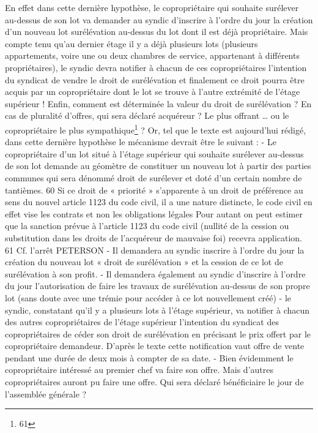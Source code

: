 	En effet dans cette dernière hypothèse, le copropriétaire qui souhaite surélever au-dessus de son lot va demander au syndic d’inscrire à l’ordre du jour la création d’un nouveau lot surélévation au-dessus du lot dont il est déjà propriétaire.
	Mais compte tenu qu’au dernier étage il y a déjà plusieurs lots (plusieurs appartements, voire une ou deux chambres de service, appartenant à différents propriétaires), le syndic devra notifier à chacun de ces copropriétaires l’intention du syndicat de vendre le droit de surélévation et finalement ce droit pourra être acquis par un copropriétaire dont le lot se trouve à l’autre extrémité de l’étage supérieur !
	Enfin, comment est déterminée la valeur du droit de surélévation ? En cas de pluralité d’offres, qui sera déclaré acquéreur ? Le plus offrant … ou le copropriétaire le plus sympathique\footnote{61} ?
	Or, tel que le texte est aujourd’hui rédigé, dans cette dernière hypothèse le mécanisme devrait être le suivant :
	- Le copropriétaire d’un lot situé à l’étage supérieur qui souhaite surélever au-dessus de son lot demande au géomètre de constituer un nouveau lot à partir des parties communes qui sera dénommé droit de surélever et doté d’un certain nombre de tantièmes.
	60 Si ce droit de « priorité » s’apparente à un droit de préférence au sens du nouvel article 1123 du code civil, il a une nature distincte, le code civil en effet vise les contrats et non les obligations légales Pour autant on peut estimer que la sanction prévue à l’article 1123 du code civil (nullité de la cession ou substitution dans les droits de l’acquéreur de mauvaise foi) recevra application.
	61 Cf. l’arrêt PETERSON
	- Il demandera au syndic inscrire à l’ordre du jour la création du nouveau lot « droit de surélévation » et la cession de ce lot de surélévation à son profit.
	- Il demandera également au syndic d’inscrire à l’ordre du jour l’autorisation de faire les travaux de surélévation au-dessus de son propre lot (sans doute avec une trémie pour accéder à ce lot nouvellement créé)
	- le syndic, constatant qu’il y a plusieurs lots à l’étage supérieur, va notifier à chacun des autres copropriétaires de l’étage supérieur l’intention du syndicat des copropriétaires de céder son droit de surélévation en précisant le prix offert par le copropriétaire demandeur. D’après le texte cette notification vaut offre de vente pendant une durée de deux mois à compter de sa date.
	- Bien évidemment le copropriétaire intéressé au premier chef va faire son offre. Mais d’autres copropriétaires auront pu faire une offre. Qui sera déclaré bénéficiaire le jour de l’assemblée générale ?
